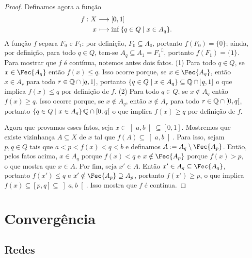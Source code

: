 \begin{proof}
Definamos agora a função
	\begin{align*}
	{f}: {X} &\longrightarrow {[0,1]} \\{x} &\longmapsto {\inf\left\{q \in Q \;\middle\vert\; x \in A_q \right\}}.
	\end{align*}
A função $f$ separa $F_0$ e $F_1$: por definição, $F_0 \subseteq A_0$, portanto $f(F_0)=\{0\}$; ainda, por definição, para todo $q \in Q$, tem-se $A_q \subseteq A_1={F_1}^\complement$, portanto $f(F_1)=\{1\}$. Para mostrar que $f$ é contínua, notemos antes dois fatos. (1) Para todo $q \in Q$, se $x \in \Fec{A_q}$ então $f(x) \leq q$. Isso ocorre porque, se $x \in \Fec{A_q}$, então $x \in A_r$ para todo $r \in \mathbb{Q} \cap \left]q,1\right]$, portanto $\left\{q \in Q \;\middle\vert\; x \in A_q \right\} \subseteq \mathbb{Q} \cap \left]q,1\right]$ o que implica $f(x) \leq q$ por definição de $f$. (2) Para todo $q \in Q$, se $x \notin A_q$ então $f(x) \geq q$. Isso ocorre porque, se $x \notin A_q$, então $x \notin A_r$ para todo $r \in \mathbb{Q} \cap \left[0,q\right[$, portanto $\left\{q \in Q \;\middle\vert\; x \in A_q \right\}\mathbb{Q} \cap \left[0,q\right[$ o que implica $f(x) \geq q$ por definição de $f$.

Agora que provamos esses fatos, seja $x \in \left]a,b\right[ \subseteq [0,1]$. Mostremos que existe vizinhança $A \subseteq X$ de $x$ tal que $f(A) \subseteq \left]a,b\right[$. Para isso, sejam $p,q \in Q$ tais que $a<p<f(x)<q<b$ e definamos $A:=A_q \setminus \Fec{A_p}$. Então, pelos fatos acima, $x \in A_q$ porque $f(x)<q$ e $x \notin \Fec{A_p}$ porque $f(x)>p$, o que mostra que $x \in A$. Por fim, seja $x' \in A$. Então $x' \in A_q \subseteq \Fec{A_q}$, portanto $f(x') \leq q$ e $x' \notin \Fec{A_p} \supseteq A_p$, portanto $f(x') \geq p$, o que implica $f(x) \subseteq [p,q] \subseteq \left]a,b\right[$. Isso mostra que $f$ é contínua.
\end{proof}




\section{Convergência}

\subsection{Redes}


